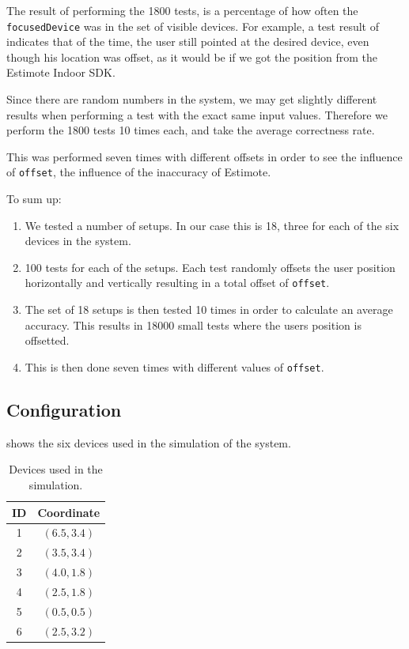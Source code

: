 The result of performing the \num{1800} tests, 
is a percentage of how often the \texttt{focusedDevice} was in the set of visible devices. 
For example, a test result of  indicates that  of the time, 
the user still pointed at the desired device, 
even though his location was offset, as it would be if we got the position from the Estimote Indoor SDK.

Since there are random numbers in the system, 
we may get slightly different results when performing a test with the exact same input values. 
Therefore we perform the \num{1800} tests \num{10} times each, 
and take the average correctness rate.

This was performed seven times with different offsets in order to see the influence of \texttt{offset},
\ie the influence of the inaccuracy of Estimote.

To sum up:
\begin{enumerate}
\item We tested a number of setups. In our case this is \num{18}, three for each of the six devices in the system.
\item \num{100} tests for each of the setups. Each test randomly offsets the user position horizontally and vertically resulting in a total offset of \texttt{offset}.
\item The set of \num{18} setups is then tested \num{10} times in order to calculate an average accuracy. This results in \num{18000} small tests where the users position is offsetted.
\item This is then done seven times with different values of \texttt{offset}.
\end{enumerate}

\subsection{Configuration}

 shows the six devices used in the simulation of the system.

\begin{table}[!hbt]
\centering
\caption{Devices used in the simulation.}
\label{tbl:evaluation:system-correctness:devices}
\begin{tabular}{c|c}
	\textbf{ID} & \textbf{Coordinate} \\ \hline
	     1      &    $(6.5, 3.4)$     \\
	     2      &    $(3.5 , 3.4)$    \\
	     3      &    $(4.0 , 1.8)$    \\
	     4      &    $(2.5 , 1.8)$    \\
	     5      &    $(0.5 , 0.5)$    \\
	     6      &    $(2.5 , 3.2)$
\end{tabular}
\end{table}

